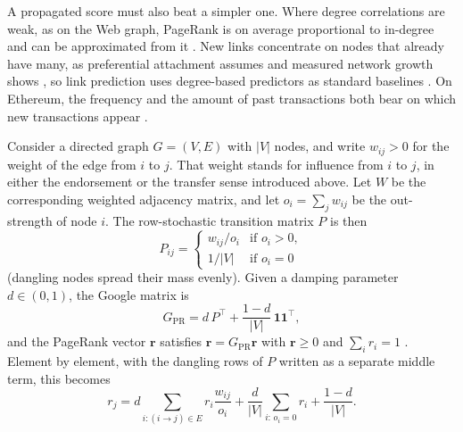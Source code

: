 A propagated score must also beat a simpler one. Where degree correlations are weak, as on the Web graph, PageRank is on average proportional to in-degree and can be approximated from it \parencite{fortunato2008indegree}. New links concentrate on nodes that already have many, as preferential attachment assumes \parencite{barabasi1999scaling} and measured network growth shows \parencite{newman2001clustering}, so link prediction uses degree-based predictors as standard baselines \parencite{libennowell2007link}. On Ethereum, the frequency and the amount of past transactions both bear on which new transactions appear \parencite{lin2022tracking}.


Consider a directed graph $G=(V,E)$ with $|V|$ nodes, and write $w_{ij}>0$ for the weight of the edge from $i$ to $j$. That weight stands for influence from $i$ to $j$, in either the endorsement or the transfer sense introduced above. Let $W$ be the corresponding weighted adjacency matrix, and let $o_i=\sum_j w_{ij}$ be the out-strength of node $i$. The row-stochastic transition matrix $P$ is then
\begin{equation}
P_{ij} =
\begin{cases}
w_{ij}/o_i & \text{if } o_i>0,\\
1/|V| & \text{if } o_i=0
\end{cases}
\label{eq:transition}
\end{equation}
(dangling nodes spread their mass evenly). Given a damping parameter $d\in(0,1)$, the Google matrix is
\begin{equation}
G_{\mathrm{PR}} = d\, P^{\top} + \frac{1-d}{|V|}\,\mathbf{1}\mathbf{1}^{\top},
\label{eq:google-matrix}
\end{equation}
and the PageRank vector $\mathbf{r}$ satisfies $\mathbf{r}=G_{\mathrm{PR}}\mathbf{r}$ with $\mathbf{r}\geq 0$ and $\sum_i r_i=1$ \parencite{langville2006pagerank}. Element by element, with the dangling rows of $P$ written as a separate middle term, this becomes
\begin{equation}
r_j = d\sum_{i:(i\to j)\in E} r_i \frac{w_{ij}}{o_i} + \frac{d}{|V|}\sum_{i:\,o_i=0} r_i + \frac{1-d}{|V|}.
\label{eq:pagerank-node}
\end{equation}


